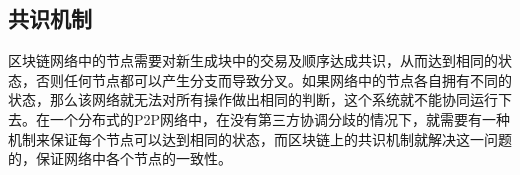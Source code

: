 












\subsection{共识机制}

区块链网络中的节点需要对新生成块中的交易及顺序达成共识，从而达到相同的状态，否则任何节点都可以产生分支而导致分叉。如果网络中的节点各自拥有不同的状态，那么该网络就无法对所有操作做出相同的判断，这个系统就不能协同运行下去。在一个分布式的P2P网络中，在没有第三方协调分歧的情况下，就需要有一种机制来保证每个节点可以达到相同的状态，而区块链上的共识机制就解决这一问题的，保证网络中各个节点的一致性。

